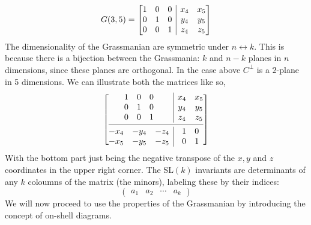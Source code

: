 \documentclass[letter,11pt]{article}
\begin{document}
\begin{equation}G(3,5) = 
\left[ \begin{array}{@{}c|c@{}}
	\begin{matrix}
		1 & 0 &  0 \\
		0 & 1 &  0 \\
		0 & 0 &  1 \\
	\end{matrix} 
	& 	\begin{matrix}
		x_4 & x_5  \\
		y_4 & y_5  \\
		z_4 & z_5  \\
	\end{matrix}  \\
\end{array} \right]
\end{equation}
The dimensionality of the Grassmanian are symmetric under $n\leftrightarrow k$. This is because there is a bijection between the Grassmania: $k$ and $n-k$ planes in $n$ dimensions, since these planes are orthogonal. In the case above $C^{\perp}$ is a $2$-plane in 5 dimensions. We can illustrate both the matrices like so,
\begin{equation}
	\left[ \begin{array}{@{}c|c@{}}
		\begin{matrix}
			1 & 0 &  0 \\
			0 & 1 &  0 \\
			0 & 0 &  1 \\
		\end{matrix} 
		& 	\begin{matrix}
			x_4 & x_5  \\
			y_4 & y_5  \\
			z_4 & z_5  \\
		\end{matrix}  \\
	\cmidrule[0.4pt]{1-2}
		\begin{matrix}
		-x_4 & -y_4 & -z_4  \\
		-x_5 & -y_5 & -z_5 \\
	\end{matrix} 
	& 	\begin{matrix}
	1 & 0  \\
	0 & 1  \\
\end{matrix} 
	\end{array} \right]
\end{equation}
With the bottom part just being the negative transpose of the $x,y$ and $z$ coordinates in the upper right corner. The SL$(k)$ invariants are determinants of any $k$ coloumns of the matrix (the minors), labeling these by their indices:
\begin{equation}
\begin{pmatrix}
a_1&a_2&\cdots &a_k
\end{pmatrix}
\end{equation}
We will now proceed to use the properties of the Grassmanian by introducing the concept of on-shell diagrams.
\newpage
\end{document}
